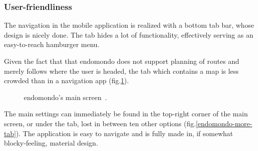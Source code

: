 \subsubsection*{User-friendliness}
The navigation in the mobile application is realized with a bottom tab bar, whose design is nicely done.
The  tab hides a lot of functionality, effectively serving as an easy-to-reach hamburger menu.

Given the fact that that endomondo does not support planning of routes and merely follows where the user is headed, the  tab which contains a map is less crowded than in a navigation app (fig.\ref{endomondo-home-img}).

\begin{figure}[h!]
    \centering
        \caption{endomondo's main screen~\cite{endomondo-home-img}.}
        \label{endomondo-home-img}
\end{figure}

The main settings can immediately be found in the top-right corner of the main screen, or under the  tab, lost in between ten other options (fig.\ref{endomondo-more-tab}).
The application is easy to navigate and is fully made in, if somewhat blocky-feeling, material design.


